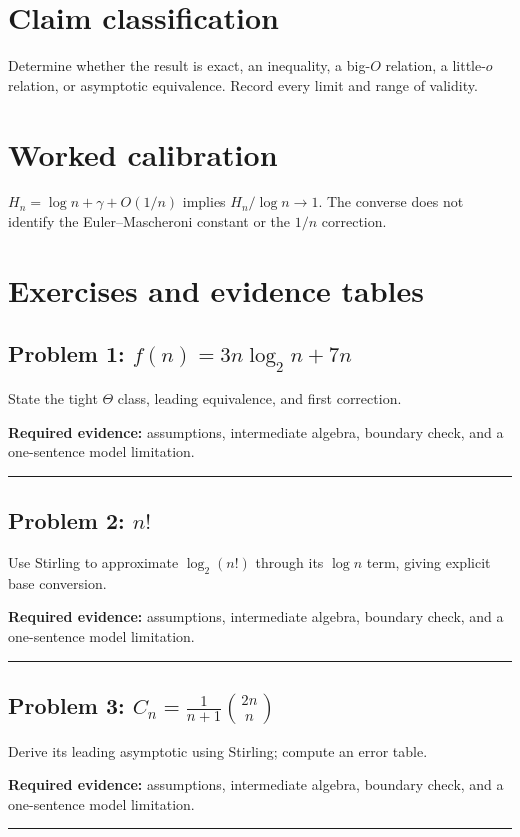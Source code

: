 \documentclass[11pt]{article}
\begin{document}
\makedoctocpage
\section{Claim classification}
Determine whether the result is exact, an inequality, a big-$O$ relation, a little-$o$ relation, or asymptotic equivalence. Record every limit and range of validity.
\section{Worked calibration}
$H_n=\log n+\gamma+O(1/n)$ implies $H_n/\log n\to1$. The converse does not identify the Euler--Mascheroni constant or the $1/n$ correction.

\section{Exercises and evidence tables}
\subsection{\texorpdfstring{Problem 1: $f(n)=3n\log_2 n+7n$}{Problem 1: Order of 3n log base 2 of n plus 7n}}
State the tight $\Theta$ class, leading equivalence, and first correction.\par
\textbf{Required evidence:} assumptions, intermediate algebra, boundary check, and a one-sentence model limitation.\par
\vspace{1.2cm}\hrule\vspace{0.4cm}
\subsection{\texorpdfstring{Problem 2: $n!$}{Problem 2: Factorial n}}
Use Stirling to approximate $\log_2(n!)$ through its $\log n$ term, giving explicit base conversion.\par
\textbf{Required evidence:} assumptions, intermediate algebra, boundary check, and a one-sentence model limitation.\par
\vspace{1.2cm}\hrule\vspace{0.4cm}
\subsection{\texorpdfstring{Problem 3: $C_n=\frac{1}{n+1}\binom{2n}{n}$}{Problem 3: Catalan-number formula}}
Derive its leading asymptotic using Stirling; compute an error table.\par
\textbf{Required evidence:} assumptions, intermediate algebra, boundary check, and a one-sentence model limitation.\par
\vspace{1.2cm}\hrule\vspace{0.4cm}
\end{document}

